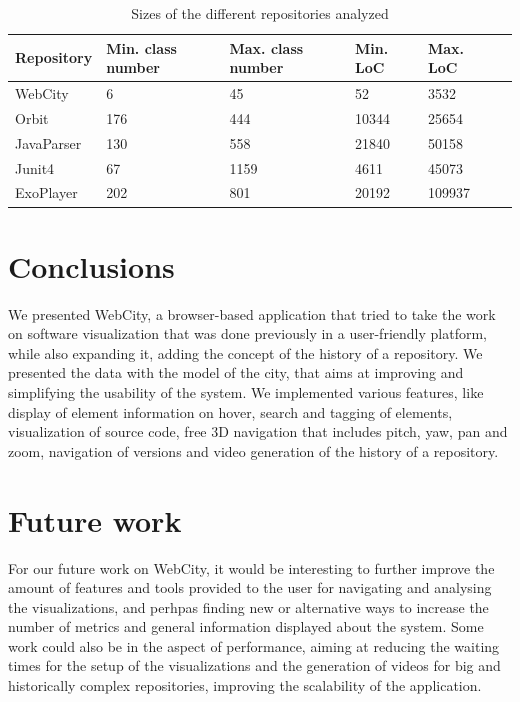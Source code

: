 \documentclass[]{usiinfbachelorproject}
\begin{document}
\begin{table}[H]
    \begin{center}
        \begin{tabular}{ | l | l | l | l | l | l |}
        \hline
        Repository & Min. class number & Max. class number & Min. LoC & Max. LoC \\ \hline
        WebCity & 6 & 45 & 52 & 3532 \\ \hline
        Orbit & 176 & 444 & 10344 & 25654 \\ \hline
        JavaParser & 130 & 558 & 21840 & 50158 \\ \hline
        Junit4 & 67 & 1159 & 4611 & 45073 \\ \hline
        ExoPlayer & 202 & 801 & 20192 & 109937 \\ \hline
        \end{tabular}
    \end{center}
    \caption{Sizes of the different repositories analyzed}
    \label{tab:performance}
\end{table}



\section{Conclusions} \label{Conclusions}
We presented WebCity, a browser-based application that tried to take the work on software visualization that was done previously in a user-friendly platform, while also expanding it, adding the concept of the history of a repository.
We presented the data with the model of the city, that aims at improving and simplifying the usability of the system.
We implemented various features, like display of element information on hover, search and tagging of elements, visualization of source code, free 3D navigation that includes pitch, yaw, pan and zoom, navigation of versions and video generation of the history of a repository.

\section{Future work} \label{Future work}

For our future work on WebCity, it would be interesting to further improve the amount of features and tools provided to the user for navigating and analysing the visualizations, and perhpas finding new or alternative ways to increase the number of metrics and general information displayed about the system.
Some work could also be in the aspect of performance, aiming at reducing the waiting times for the setup of the visualizations and the generation of videos for big and historically complex repositories, improving the scalability of the application.
\end{document}
